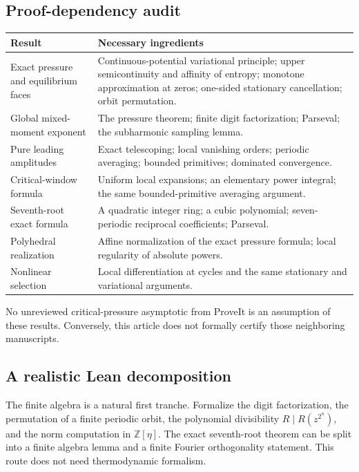 \documentclass[11pt,a4paper]{article}
\numberwithin{equation}{section}
\theoremstyle{definition}
\theoremstyle{remark}
\newcommand{\ZZ}{\mathbb Z}
\begin{document}
\subsection{Proof-dependency audit}
\begin{center}
\begin{tabular}{@{}>{\raggedright\arraybackslash}p{}>{\raggedright\arraybackslash}p{}@{}}
\toprule
Result & Necessary ingredients\\
\midrule
Exact pressure and equilibrium faces & Continuous-potential variational
principle; upper semicontinuity and affinity of entropy; monotone
approximation at zeros; one-sided stationary cancellation; orbit
permutation.\\[1.5mm]
Global mixed-moment exponent & The pressure theorem; finite digit
factorization; Parseval; the subharmonic sampling lemma.\\[1.5mm]
Pure leading amplitudes & Exact telescoping; local vanishing orders;
periodic averaging; bounded primitives; dominated convergence.\\[1.5mm]
Critical-window formula & Uniform local expansions; an elementary
power integral; the same bounded-primitive averaging argument.\\[1.5mm]
Seventh-root exact formula & A quadratic integer ring; a cubic
polynomial; seven-periodic reciprocal coefficients; Parseval.\\[1.5mm]
Polyhedral realization & Affine normalization of the exact pressure
formula; local regularity of absolute powers.\\[1.5mm]
Nonlinear selection & Local differentiation at cycles and the same
stationary and variational arguments.\\
\bottomrule
\end{tabular}
\end{center}
No unreviewed critical-pressure asymptotic from ProveIt is an assumption
of these results. Conversely, this article does not formally certify
those neighboring manuscripts.

\subsection{A realistic Lean decomposition}
The finite algebra is a natural first tranche. Formalize the digit
factorization, the permutation of a finite periodic orbit, the
polynomial divisibility $R\mid R(z^{2^n})$, and the norm computation
in $\ZZ[\eta]$. The exact seventh-root theorem can be split into a
finite algebra lemma and a finite Fourier orthogonality statement.
This route does not need thermodynamic formalism.
\end{document}
